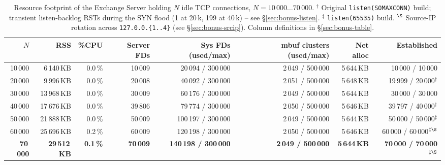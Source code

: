 \documentclass[11pt,a4paper]{article}
\begin{document}
\begin{table}[H]
\centering
\scriptsize
\setlength{\tabcolsep}{4pt}
\begin{tabular}{@{}rrrrrrrr@{}}
\toprule
\textbf{$N$} & \textbf{RSS} & \textbf{\%CPU} & \textbf{Server FDs} &
\textbf{Sys FDs (used/max)} & \textbf{mbuf clusters (used/max)} &
\textbf{Net alloc} & \textbf{Established} \\
\midrule
10\,000 &  6\,140\,KB & 0.0\,\% & 10\,009 &  20\,094 / 300\,000 & 2\,049 / 500\,000 & 5\,644\,KB & 10\,000 / 10\,000 \\
20\,000 &  9\,996\,KB & 0.0\,\% & 20\,008 &  40\,092 / 300\,000 & 2\,051 / 500\,000 & 5\,648\,KB & 19\,999 / 20\,000$^{\dagger}$ \\
30\,000 & 13\,968\,KB & 0.0\,\% & 30\,009 &  60\,176 / 300\,000 & 2\,049 / 500\,000 & 5\,644\,KB & 30\,000 / 30\,000 \\
40\,000 & 17\,676\,KB & 0.0\,\% & 39\,806 &  79\,774 / 300\,000 & 2\,050 / 500\,000 & 5\,646\,KB & 39\,797 / 40\,000$^{\dagger}$ \\
50\,000 & 21\,888\,KB & 0.0\,\% & 50\,009 & 100\,197 / 300\,000 & 2\,049 / 500\,000 & 5\,644\,KB & 50\,000 / 50\,000$^{\ddagger}$ \\
60\,000 & 25\,696\,KB & 0.2\,\% & 60\,009 & 120\,198 / 300\,000 & 2\,050 / 500\,000 & 5\,646\,KB & 60\,000 / 60\,000$^{\ddagger\S}$ \\
\textbf{70\,000} & \textbf{29\,512\,KB} & \textbf{0.1\,\%} & \textbf{70\,009} & \textbf{140\,198 / 300\,000} & \textbf{2\,049 / 500\,000} & \textbf{5\,644\,KB} & \textbf{70\,000 / 70\,000}$^{\ddagger\S}$ \\
\bottomrule
\end{tabular}
\caption{Resource footprint of the Exchange Server holding $N$ idle TCP connections,
$N = 10\,000 \dots 70\,000$.  $^{\dagger}$ Original \texttt{listen(SOMAXCONN)} build;
transient listen-backlog RSTs during the SYN flood (1 at 20\,k, 199 at 40\,k) --
see \S\ref{sec:bonus-listen}.  $^{\ddagger}$ \texttt{listen(65535)} build.
$^{\S}$ Source-IP rotation across \texttt{127.0.0.\{1..4\}} (see \S\ref{sec:bonus-srcip}).
Column definitions in \S\ref{sec:bonus-table}.}
\label{tab:bonus-full}
\end{table}
\end{document}
